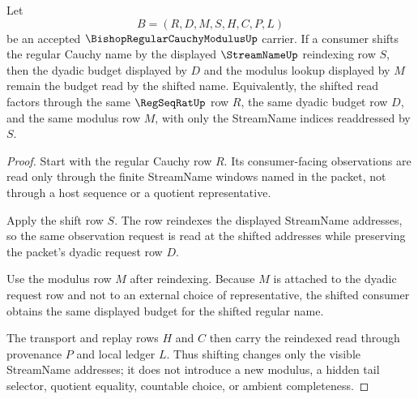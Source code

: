 \begin{theorem}
\label{thm:bishop-regular-cauchy-modulus-shift-stability}
Let
$$
B=(R,D,M,S,H,C,P,L)
$$
be an accepted $\BishopRegularCauchyModulusUp$ carrier. If a consumer shifts the regular Cauchy name by the displayed $\StreamNameUp$ reindexing row $S$, then the dyadic budget displayed by $D$ and the modulus lookup displayed by $M$ remain the budget read by the shifted name. Equivalently, the shifted read factors through the same $\RegSeqRatUp$ row $R$, the same dyadic budget row $D$, and the same modulus row $M$, with only the StreamName indices readdressed by $S$.
\end{theorem}
\begin{proof}
Start with the regular Cauchy row $R$. Its consumer-facing observations are read only through the finite StreamName windows named in the packet, not through a host sequence or a quotient representative.

Apply the shift row $S$. The row reindexes the displayed StreamName addresses, so the same observation request is read at the shifted addresses while preserving the packet's dyadic request row $D$.

Use the modulus row $M$ after reindexing. Because $M$ is attached to the dyadic request row and not to an external choice of representative, the shifted consumer obtains the same displayed budget for the shifted regular name.

The transport and replay rows $H$ and $C$ then carry the reindexed read through provenance $P$ and local ledger $L$. Thus shifting changes only the visible StreamName addresses; it does not introduce a new modulus, a hidden tail selector, quotient equality, countable choice, or ambient completeness.
\end{proof}




